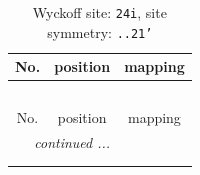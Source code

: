 \documentclass[fleqn,8pt]{jsarticle}
\begin{document}
\renewcommand{\arraystretch}{1.2}
\begin{longtable}{ccc}
\caption{Wyckoff site: {\tt 24i}, site symmetry: {\tt ..21'}}
 \\
 \hline \hline
No. & position & mapping \\ \hline \endfirsthead

\multicolumn{2}{l}{\tablename\ \thetable{}} \\
 \hline \hline
No. & position & mapping \\ \hline \endhead

 \hline \hline
\multicolumn{2}{r}{\footnotesize\it continued ...} \\ \endfoot

 \hline \hline
\multicolumn{2}{r}{} \\ \endlastfoot


\end{longtable}
\end{document}
